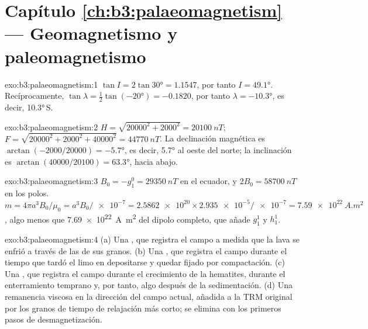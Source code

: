 \section*{Capítulo \ref{ch:b3:palaeomagnetism} --- Geomagnetismo y paleomagnetismo}

\begin{solution}{exo:b3:palaeomagnetism:1}
$\tan I = 2\tan\ang{30} = 1.1547$, por tanto $I = \ang{49.1}$. Recíprocamente, $\tan\lambda
= \tfrac12\tan(\ang{-20}) = -0.1820$, por tanto $\lambda = \ang{-10.3}$, es decir,
\ang{10.3}\,S.
\end{solution}

\begin{solution}{exo:b3:palaeomagnetism:2}
$H = \sqrt{20000^2 + 2000^2} = \qty{20100}{nT}$;
$F = \sqrt{20000^2 + 2000^2 + 40000^2} = \qty{44770}{nT}$. La declinación magnética es
$\arctan(-2000/20000) = \ang{-5.7}$, es decir, \ang{5.7} al oeste del norte;
la inclinación es $\arctan(40000/20100) = \ang{63.3}$, hacia abajo.
\end{solution}

\begin{solution}{exo:b3:palaeomagnetism:3}
$B_0 = -g_1^0 = \qty{29350}{nT}$ en el ecuador, y $2B_0 = \qty{58700}{nT}$ en
los polos. $m = 4\pi a^3B_0/\mu_0 = a^3B_0/\num{e-7} = \num{2.5862e20}\times
\num{2.935e-5}/\num{e-7} = \qty{7.59e22}{A.m^2}$, algo menos que
\qty{7.69e22}{A.m^2} del dipolo completo, que añade $g_1^1$ y $h_1^1$.
\end{solution}

\begin{solution}{exo:b3:palaeomagnetism:4}
(a) Una , que registra el campo a medida que la lava se enfrió
a través de las  de sus granos. (b) Una , que registra el campo durante el tiempo que tardó el limo en depositarse y
quedar fijado por compactación. (c) Una , que registra el
campo durante el crecimiento de la hematites, durante el enterramiento temprano y, por tanto, algo
después de la sedimentación. (d) Una remanencia viscosa en la dirección del campo actual, añadida a la
TRM original por los granos de tiempo de relajación más corto; se elimina con los
primeros pasos de desmagnetización.
\end{solution}

